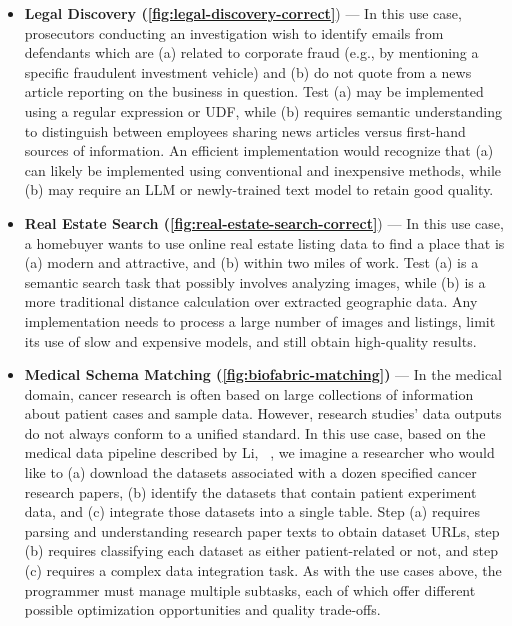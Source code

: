\begin{itemize}
    \item {\bf Legal Discovery (\autoref{fig:legal-discovery-correct}}) --- In this use case, prosecutors conducting an investigation  wish to identify emails from defendants which are (a) related to corporate fraud (e.g., by mentioning a specific fraudulent investment vehicle) and (b) do not quote from a news article reporting on the business in question. Test (a) may be implemented using a regular expression or UDF, while (b) requires semantic understanding to distinguish between employees sharing news articles versus first-hand sources of information. An efficient implementation would recognize that (a) can likely be implemented using conventional and inexpensive methods, while (b) may require an LLM or newly-trained text model to retain good quality.
    \item {\bf Real Estate Search (\autoref{fig:real-estate-search-correct}}) --- In this use case, a homebuyer wants to use online real estate listing data to find a place that is (a) modern and attractive, and (b) within two miles of work. Test (a) is a semantic search task that possibly involves analyzing images, while (b) is a more traditional distance calculation over extracted geographic data.  Any implementation needs to process a large number of images and listings, limit its use of slow and expensive models, and still obtain high-quality results.
    \item {\bf Medical Schema Matching (\autoref{fig:biofabric-matching})} --- In the medical domain, cancer research is often based on large collections of information about patient cases and sample data. However, research studies' data outputs do not always conform to a unified standard. In this use case, based on the medical data pipeline described by Li, \etal~\cite{li2023proteogenomic}, we imagine a researcher who would like to (a) download the datasets associated with a dozen specified cancer research papers, (b) identify the datasets that contain patient experiment data, and (c) integrate those datasets into a single table.  Step (a) requires parsing and understanding research paper texts to obtain dataset URLs, step (b) requires classifying each dataset as either patient-related or not, and step (c) requires a complex data integration task. As with the use cases above, the programmer must manage multiple subtasks, each of which offer different possible optimization opportunities and quality trade-offs.
\end{itemize}


